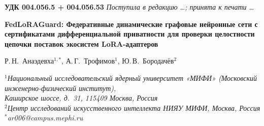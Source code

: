 \documentclass[12pt,a4paper]{article}
\theoremstyle{definition}
\theoremstyle{remark}
\begin{document}
\thispagestyle{empty}


\begin{otherlanguage}{russian}
\noindent\textbf{УДК 004.056.5 + 004.056.53}
\hfill
\textit{Поступила в редакцию \ldots; принята к печати \ldots}

\vspace{0.8em}

\begin{center}
{\large\bfseries
FedLoRAGuard: Федеративные динамические графовые нейронные сети
с сертификатами дифференциальной приватности для проверки
целостности цепочки поставок экосистем LoRA-адаптеров
\par}

\vspace{0.6em}

{\normalsize
Р.\,Н.~Анаэдевха$^{1,*}$, А.\,Г.~Трофимов$^{1}$, Ю.\,В.~Бородачёв$^{2}$
\par}

\vspace{0.4em}

{\small\itshape
$^{1}$Национальный исследовательский ядерный университет «МИФИ»
(Московский инженерно-физический институт),\\
Каширское шоссе, д.~31, 115409 Москва, Россия\\
$^{2}$Центр исследований искусственного интеллекта НИЯУ МИФИ,
Москва, Россия\\
$^{*}$ar006@campus.mephi.ru
\par}
\end{center}

\vspace{0.5em}


\end{otherlanguage}
\end{document}
